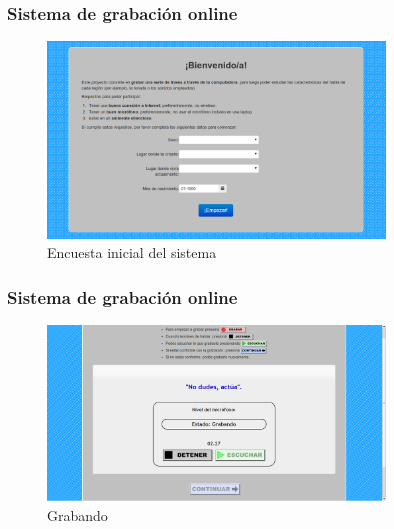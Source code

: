 \documentclass[mathserif]{beamer}%
\begin{document}
\begin{frame}
	\frametitle{Sistema de grabación online}
	
	\begin{figure}[h!]
		\centerline{\includegraphics[width=0.8\textwidth]{pag-inicio2} }
		\caption{Encuesta inicial del sistema}
		\label{figEncuesta}
	\end{figure}
\end{frame}

%	

\begin{frame}
	\frametitle{Sistema de grabación online}
	
	\begin{figure}[h!]
		\centerline{\includegraphics[width=0.8\textwidth]{pag-grabar1} }
		\caption{Grabando}
		\label{figEncuesta}
	\end{figure}
\end{frame}
\end{document}
